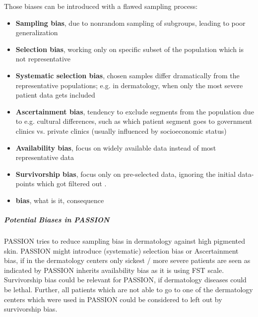 \documentclass[12pt, a4paper, oneside]{book}   	%
\begin{document}
				Those biases can be introduced with a flawed sampling process:
				\begin{itemize}
					\item \textbf{Sampling bias}, due to nonrandom sampling of subgroups, leading to poor generalization \autocite{Mehrabi_2021}
					\item \textbf{Selection bias}, working only on specific subset of the population which is not representative \autocites{Mestner_2022}{Chakraborty_2024}
					\item \textbf{Systematic selection bias}, chosen samples differ dramatically from the representative populations; e.g. in dermatology, when only the most severe patient data gets included \autocite{Chakraborty_2024, c5,c6,c33}
					\item \textbf{Ascertainment bias}, tendency to exclude segments from the population due to e.g. cultural differences, such as which patient segment goes to government clinics vs. private clinics (usually influenced by socioeconomic status) \autocite{Chakraborty_2024, c5}
					\item \textbf{Availability bias}, focus on widely available data instead of most representative data \autocites{Chakraborty_2024, c9, c10}{}
					\item \textbf{Survivorship bias}, focus only on pre-selected data, ignoring the initial data-points which got filtered out \autocite{Mestner_2022}.
					
					\item \textbf{bias}, what is it, consequence \autocite{}
				\end{itemize}
				
				
				\subparagraph{Potential Biases in PASSION}
				PASSION tries to reduce sampling bias in dermatology against high pigmented skin.
				PASSION might introduce (systematic) selection bias or Ascertainment bias, if in the dermatology centers only sickest / more severe patients are seen as indicated by \cite{Chakraborty_2024}
				PASSION inherits availability bias as it is using \gls{FST} scale.
				Survivorship bias could be relevant for PASSION, if dermatology diseases could be lethal. Further, all patients which are not able to go to one of the dermatology centers which were used in PASSION could be considered to left out by survivorship bias.
				
\end{document}
